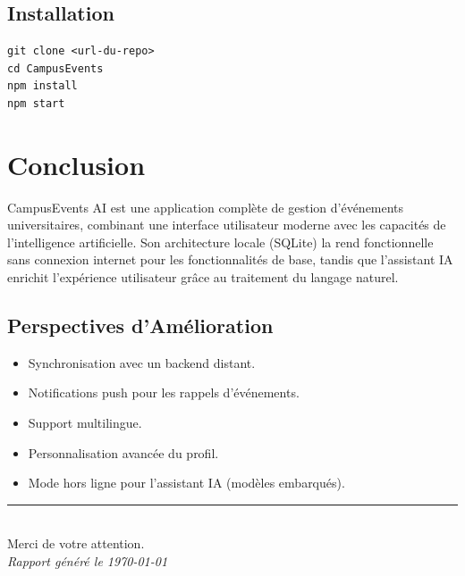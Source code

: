 \documentclass[12pt,a4paper]{article}
\begin{document}
\subsection{Installation}

\begin{lstlisting}
git clone <url-du-repo>
cd CampusEvents
npm install
npm start
\end{lstlisting}

\section{Conclusion}

CampusEvents AI est une application complète de gestion d'événements universitaires, combinant une interface utilisateur moderne avec les capacités de l'intelligence artificielle. Son architecture locale (SQLite) la rend fonctionnelle sans connexion internet pour les fonctionnalités de base, tandis que l'assistant IA enrichit l'expérience utilisateur grâce au traitement du langage naturel.

\subsection{Perspectives d'Amélioration}

\begin{itemize}
    \item Synchronisation avec un backend distant.
    \item Notifications push pour les rappels d'événements.
    \item Support multilingue.
    \item Personnalisation avancée du profil.
    \item Mode hors ligne pour l'assistant IA (modèles embarqués).
\end{itemize}

\newpage
\begin{center}
    \vspace*{4cm}
    \rule{0.4\textwidth}{0.5pt}\\[1cm]
    {\large Merci de votre attention.}\\[0.3cm]
    {\small \textit{Rapport généré le \today}}
\end{center}
\end{document}
